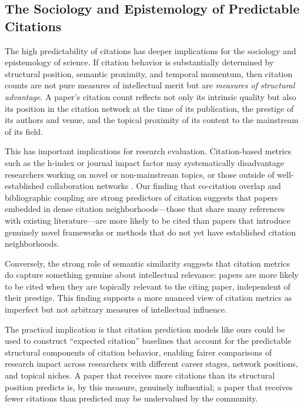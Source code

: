\documentclass[12pt,a4paper]{article}
\begin{document}
\subsection{The Sociology and Epistemology of Predictable Citations}

The high predictability of citations has deeper implications for the sociology and
epistemology of science. If citation behavior is substantially determined by
structural position, semantic proximity, and temporal momentum, then citation counts
are not pure measures of intellectual merit but are \textit{measures of structural
advantage}. A paper's citation count reflects not only its intrinsic quality but
also its position in the citation network at the time of its publication, the
prestige of its authors and venue, and the topical proximity of its content to the
mainstream of its field.

This has important implications for research evaluation. Citation-based metrics
such as the h-index or journal impact factor may systematically disadvantage
researchers working on novel or non-mainstream topics, or those outside of
well-established collaboration networks \citep{bornmann2008what}. Our finding that
co-citation overlap and bibliographic coupling are strong predictors of citation
suggests that papers embedded in dense citation neighborhoods---those that share
many references with existing literature---are more likely to be cited than papers
that introduce genuinely novel frameworks or methods that do not yet have established
citation neighborhoods.

Conversely, the strong role of semantic similarity suggests that citation metrics
do capture something genuine about intellectual relevance: papers are more likely
to be cited when they are topically relevant to the citing paper, independent of
their prestige. This finding supports a more nuanced view of citation metrics as
imperfect but not arbitrary measures of intellectual influence.

The practical implication is that citation prediction models like ours could be
used to construct ``expected citation'' baselines that account for the predictable
structural components of citation behavior, enabling fairer comparisons of research
impact across researchers with different career stages, network positions, and
topical niches. A paper that receives more citations than its structural position
predicts is, by this measure, genuinely influential; a paper that receives fewer
citations than predicted may be undervalued by the community.
\end{document}
